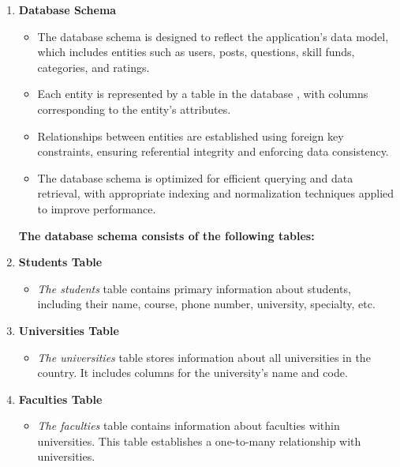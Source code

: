 \begin{enumerate}
    \item \textbf{Database Schema}
\begin{itemize}
    \item The database schema is designed to reflect the application's data model, which includes entities such as users, posts, questions, skill funds, categories, and ratings.
    \item Each entity is represented by a table in the database \cite{dbms}, with columns corresponding to the entity's attributes.
    \item Relationships between entities are established using foreign key constraints, ensuring referential integrity and enforcing data consistency.
    \item The database \cite{dbms} schema is optimized for efficient querying and data retrieval, with appropriate indexing and normalization techniques applied to improve performance.
\end{itemize}

\textbf{The database \cite{dbms} schema consists of the following tables:}

\vspace{0.5cm}
\par
\item \textbf{Students Table}

\begin{itemize}
\item \textit{The students} table contains primary information about students, including their name, course, phone number, university, specialty, etc.
\end{itemize}

\item \textbf{Universities Table}
\begin{itemize}
\item \textit{The universities} table stores information about all universities in the country. It includes columns for the university's name and code.
\end{itemize}

\item \textbf{Faculties Table}
\begin{itemize}
\item \textit{The faculties} table contains information about faculties within universities. This table establishes a one-to-many relationship with universities.
\end{itemize}


\end{enumerate}
